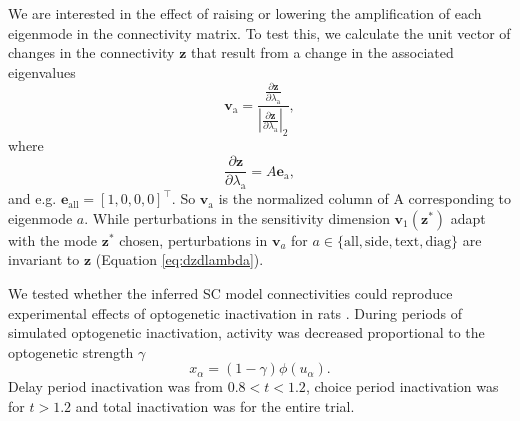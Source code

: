 \documentclass[11pt]{article}
\begin{document}
We are interested in the effect of raising or lowering the amplification of each eigenmode in the connectivity matrix.
To test this, we calculate the unit vector of changes in the connectivity $\mathbf{z}$ that result from a change in the associated eigenvalues
\begin{equation}
\mathbf{v}_{\text{a}} = \frac{\frac{\partial \mathbf{z}}{\partial \lambda_{\text{a}}}}{|\frac{\partial \mathbf{z}}{\partial \lambda_{\text{a}}}|_2},
\end{equation}
where
\begin{equation} \label{eq:dzdlambda}
\frac{\partial \mathbf{z}}{\partial \lambda_{\text{a}}} = A\mathbf{e}_{\text{a}},
\end{equation}
and e.g. $\mathbf{e}_{\text{all}} = [1, 0, 0, 0]^\top$.
So $\mathbf{v}_{\text{a}}$ is the normalized column of A corresponding to eigenmode $a$.
While perturbations in the sensitivity dimension $\mathbf{v}_1(\mathbf{z}^*)$ adapt with the mode $\mathbf{z}^*$ chosen, perturbations in $\mathbf{v}_a$ for $a \in \{\text{all}, \text{side}, \text{text}, \text{diag}\}$ are invariant to $\mathbf{z}$ (Equation \ref{eq:dzdlambda}).
%

We tested whether the inferred SC model connectivities could reproduce experimental effects of optogenetic inactivation in rats \cite{duan2015requirement}.
During periods of simulated optogenetic inactivation, activity was decreased proportional to the optogenetic strength $\gamma$
\begin{equation}
x_\alpha = (1-\gamma)\phi(u_\alpha).
\end{equation}
Delay period inactivation was from $0.8 < t < 1.2$, choice period inactivation was for $t > 1.2$ and total inactivation was for the entire trial.
\end{document}
